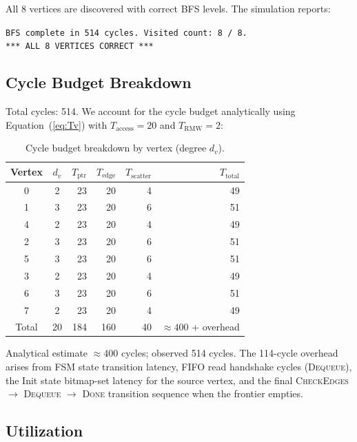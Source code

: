 All 8 vertices are discovered with correct BFS levels. The simulation reports:
\begin{center}
\texttt{BFS complete in 514 cycles. Visited count: 8 / 8.}\\
\texttt{*** ALL 8 VERTICES CORRECT ***}
\end{center}

\subsection{Cycle Budget Breakdown}

Total cycles: 514. We account for the cycle budget analytically using
Equation~(\ref{eq:Tv}) with $T_\text{access} = 20$ and $T_\text{RMW} = 2$:

\begin{table}[h]
\centering
\caption{Cycle budget breakdown by vertex (degree $d_v$).}
\label{tab:cycle_budget}
\small
\begin{tabular}{@{}ccrrrr@{}}
\toprule
Vertex & $d_v$ & $T_\text{ptr}$ & $T_\text{edge}$ & $T_\text{scatter}$ & $T_\text{total}$ \\
\midrule
0 & 2 & 23 & 20 & 4  & 49 \\
1 & 3 & 23 & 20 & 6  & 51 \\
4 & 2 & 23 & 20 & 4  & 49 \\
2 & 3 & 23 & 20 & 6  & 51 \\
5 & 3 & 23 & 20 & 6  & 51 \\
3 & 2 & 23 & 20 & 4  & 49 \\
6 & 3 & 23 & 20 & 6  & 51 \\
7 & 2 & 23 & 20 & 4  & 49 \\
\midrule
Total & 20 & 184 & 160 & 40 & $\approx 400$ + overhead \\
\bottomrule
\end{tabular}
\end{table}

Analytical estimate $\approx 400$ cycles; observed 514 cycles.
The 114-cycle overhead arises from FSM state transition latency, FIFO read handshake
cycles (\textsc{Dequeue}), the Init state bitmap-set latency for the source vertex,
and the final \textsc{CheckEdges} $\to$ \textsc{Dequeue} $\to$ \textsc{Done}
transition sequence when the frontier empties.

\subsection{Utilization}


